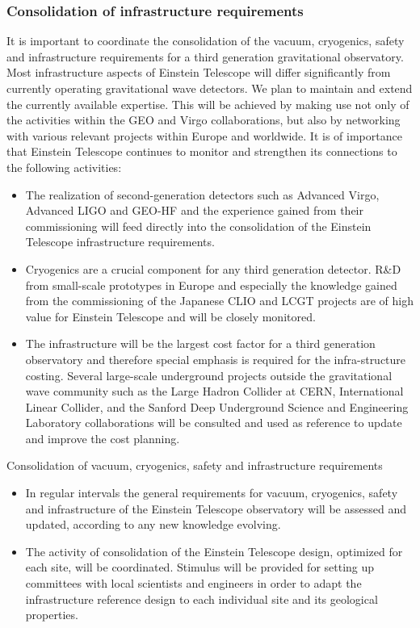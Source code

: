 \subsubsection{Consolidation of infrastructure requirements}
It is important to coordinate the consolidation of the vacuum, cryogenics, safety and infrastructure requirements for a third generation gravitational observatory. Most infrastructure aspects of Einstein Telescope will differ significantly from currently operating gravitational wave detectors. We plan to maintain and extend the currently available expertise. This will be achieved by making use not only of the activities within the GEO and Virgo collaborations, but also by networking with various relevant projects within Europe and worldwide. It is of importance that Einstein Telescope continues to monitor and strengthen its connections to the following activities: 
\begin{itemize}
\item{} The realization of second-generation detectors such as Advanced Virgo, Advanced LIGO and GEO-HF and the experience gained from their commissioning will feed directly into the consolidation of the Einstein Telescope infrastructure requirements. 
\item{} Cryogenics are a crucial component for any third generation detector. R\&D from small-scale prototypes in Europe and especially the knowledge gained from the commissioning of the Japanese CLIO and LCGT projects are of high value for Einstein Telescope and will be closely monitored. 
\item{} The infrastructure will be the largest cost factor for a third generation observatory and therefore special emphasis is required for the infra-structure costing. Several large-scale underground projects outside the gravitational wave community such as the Large Hadron Collider at CERN, International Linear Collider, and the Sanford Deep Underground Science and Engineering Laboratory collaborations will be consulted and used as reference to update and improve the cost planning. 
\end{itemize}

Consolidation of vacuum, cryogenics, safety and infrastructure requirements 
\begin{itemize}
\item{} In regular intervals the general requirements for vacuum, cryogenics, safety and infrastructure of the Einstein Telescope observatory will be assessed and updated, according to any new knowledge evolving. 
\item{} The activity of consolidation of the Einstein Telescope design, optimized for each site, will be coordinated. Stimulus will be provided for setting up committees with local scientists and engineers in order to adapt the infrastructure reference design to each individual site and its geological properties. 
\end{itemize}

